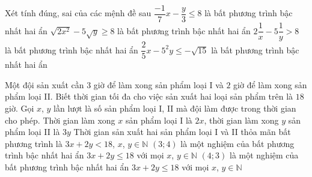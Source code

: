 \begin{ex}%
	Xét tính đúng, sai  của các mệnh đề sau
	 \choiceTF
		{\True $\dfrac{-1}{7}x  - \dfrac{y}{3} \leq 8$ là bất phương trình bậc nhất hai ẩn}
		{$\sqrt{2x^2} - 5\sqrt{y}  \geq 8$ là bất phương trình bậc nhất hai ẩn}
		{$2\dfrac{1}{x} -  5\dfrac{1}{y} > 8$ là bất phương trình bậc nhất hai ẩn}
		{\True $\dfrac{2}{5}x - 5^2 y \leq -\sqrt{15}$ là bất  phương trình bậc nhất hai ẩn}
\end{ex}

\begin{ex}%
	Một đội sản xuất cần $3$  giờ để làm xong sản phẩm loại I và $2$ giờ để làm xong sản phẩm loại II. Biết thời gian tối đa cho việc sản xuất hai loại sản phẩm trên là $18$ giờ. Gọi $x$, $y$ lần lượt là số sản phẩm loại I, II mà đội làm được trong thời gian cho phép.
	 \choiceTF
		{  Thời gian làm xong $x$ sản phẩm loại I là $2x$, thời gian làm xong $y$ sản phẩm loại II là $3y$}
		{ Thời gian sản  xuất hai sản phẩm loại I và II thỏa mãn bất phương trình là $3x + 2y < 18$, $x$, $y \in \mathbb{N}$}
		{\True $(3;4)$ là một nghiệm của bất phương trình bậc nhất hai ẩn $3x + 2y \leq  18$ với mọi $x$, $y \in \mathbb{N}$}
		{\True $(4;3)$ là một nghiệm của bất phương  trình bậc nhất hai ẩn $3x + 2y \leq 18$ với mọi $x$, $y \in \mathbb{N}$}
\end{ex}

